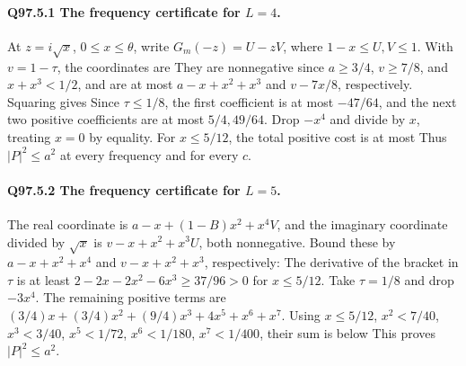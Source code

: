 \paragraph{Q97.5.1 The frequency certificate for \(L=\allowbreak 4\).}
At \(z=\allowbreak i\sqrt x\), \(0\le\allowbreak  x\le\allowbreak \theta\), write
\(G_m(-z)=\allowbreak U-zV\), where \(1-x\le\allowbreak  U,\allowbreak V\le\allowbreak 1\).
With \(v=\allowbreak 1-\tau\), the coordinates are
They are nonnegative since \(a\ge\allowbreak 3/4\), \(v\ge\allowbreak 7/8\),
and \(x+x^3<\allowbreak 1/2\), and are at most \(a-x+x^2+x^3\) and
\(v-7x/8\), respectively. Squaring gives
Since \(\tau\le\allowbreak 1/8\), the first coefficient is at most \(-47/64\),
and the next two positive coefficients are at most \(5/4,\allowbreak 49/64\).
Drop \(-x^4\) and divide by \(x\), treating \(x=\allowbreak 0\) by equality.
For \(x\le\allowbreak 5/12\), the total positive cost is at most
Thus \(|P|^2\le\allowbreak  a^2\) at every frequency and for every \(c\).

\paragraph{Q97.5.2 The frequency certificate for \(L=\allowbreak 5\).}
The real coordinate is \(a-x+(1-B)x^2+x^4V\), and the imaginary
coordinate divided by \(\sqrt x\) is \(v-x+x^2+x^3U\), both nonnegative.
Bound these by \(a-x+x^2+x^4\) and \(v-x+x^2+x^3\), respectively:
The derivative of the bracket in \(\tau\) is at least
\(2-2x-2x^2-6x^3\ge\allowbreak 37/96>\allowbreak 0\) for \(x\le\allowbreak 5/12\).
Take \(\tau=\allowbreak 1/8\) and drop \(-3x^4\). The remaining positive terms are
\((3/4)x+(3/4)x^2+(9/4)x^3+4x^5+x^6+x^7\).
Using \(x\le\allowbreak 5/12\), \(x^2<\allowbreak 7/40\), \(x^3<\allowbreak 3/40\),
\(x^5<\allowbreak 1/72\), \(x^6<\allowbreak 1/180\), \(x^7<\allowbreak 1/400\), their sum is below
This proves \(|P|^2\le\allowbreak  a^2\).

